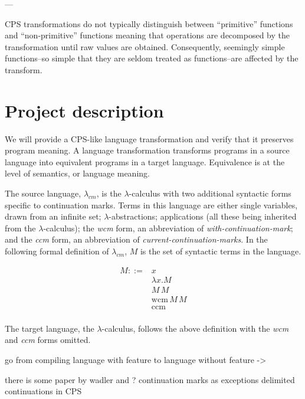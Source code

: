 \documentclass[ms]{byuprop}
\newcounter{definition}
\begin{document}
---

CPS transformations do not typically distinguish between ``primitive'' functions and ``non-primitive'' functions meaning that operations are decomposed by the transformation until raw values are obtained. Consequently, seemingly simple functions--so simple that they are seldom treated as functions--are affected by the transform.

\section{Project description}

We will provide a CPS-like language transformation and verify that it preserves program meaning. A language transformation transforms programs in a source language into equivalent programs in a target language. Equivalence is at the level of semantics, or language meaning.

The source language, $\lambda_{cm}$, is the $\lambda$-calculus with two additional syntactic forms specific to continuation marks. Terms in this language are either single variables, drawn from an infinite set; $\lambda$-abstractions; applications (all these being inherited from the $\lambda$-calculus); the \emph{wcm} form, an abbreviation of \emph{with-continuation-mark}; and the \emph{ccm} form, an abbreviation of \emph{current-continuation-marks}. In the following formal definition of $\lambda_{cm}$, $M$ is the set of syntactic terms in the language.

\begin{align*}
M ::= &x\\
      &\lambda x.M\\
      &M\,M\\
      &\mathrm{wcm}\,M\,M\\
      &\mathrm{ccm}\\
\end{align*}

The target language, the $\lambda$-calculus, follows the above definition with the \emph{wcm} and \emph{ccm} forms omitted.

go from compiling language with feature to language without feature -> 

there is some paper by wadler and ?
continuation marks as exceptions
delimited continuations in CPS
\end{document}
